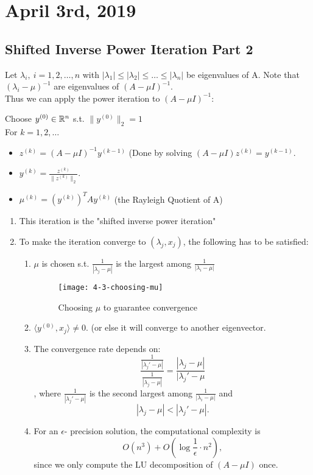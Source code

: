 \documentclass[../main/main.tex]{subfiles}
\begin{document}
\section{April  3rd, 2019}
\subsection{Shifted Inverse Power Iteration Part 2}
Let $\lambda_i,\ i=1,2,\ldots,n$ with $|\lambda_1|\le |\lambda_2|\le \ldots\le |\lambda_n|$ be eigenvalues of A. Note that $(\lambda_i-\mu)^{-1}$ are eigenvalues of $(A-\mu I)^{-1}$.\\

Thus we can apply the power iteration to $(A-\mu I)^{-1}$:
\begin{algo}
	Choose $y^{(0)}\in \mathbb{R}^{n}$ s.t. $\|y^{(0)}\|_2=1$\\ 
	For $k=1,2,\ldots$
	\begin{itemize}
		\item $z^{(k)}=(A-\mu I)^{-1} y^{(k-1)}$ (Done by solving $(A-\mu I)z^{(k)}=y^{(k-1)}$.
		\item $y^{(k)}=\frac{z^{(k)}}{\|z^{(k)}\|_2}$.
		\item $\mu^{(k)}=(y^{(k)})^{T}Ay^{(k)}$ (the Rayleigh Quotient of A)
	\end{itemize}
\end{algo}
\begin{enumerate}
	\item This iteration is the "shifted inverse power iteration"
	\item To make the iteration converge to $(\lambda_j,x_j)$, the following has to be satisfied:
	\begin{enumerate}
		\item $\mu$ is chosen s.t. $\frac{1}{|\lambda_j-\mu|}$ is the largest among $\frac{1}{|\lambda_i-\mu|}$
			\begin{figure}[h!]
				\centering
				\texttt{[image: 4-3-choosing-mu]}
				\caption{Choosing  $\mu$ to guarantee convergence}
			\end{figure}
		\item $\langle y^{(0)},x_j\rangle \neq 0$. (or else it will converge to another eigenvector.
		\item The convergence rate depends on: \[
				\frac{\frac{1}{|\lambda_j'-\mu|}}{\frac{1}{|\lambda_j-\mu|}}=\frac{|\lambda_j-\mu|}{|\lambda_j'-\mu}
		\],  where $\frac{1}{|\lambda_j'-\mu|}$ is the second largest among $\frac{1}{|\lambda_i-\mu|}$ and \[
		|\lambda_j-\mu|<|\lambda_j'-\mu|
		.\] 
	\item For an $\epsilon$- precision solution, the computational complexity is \[
	O(n^3)+O\left(\log \frac{1}{\epsilon}\cdot n^2\right)
,\] since we only compute the LU decomposition of  $\left( A-\mu I \right) $ once. 
\end{enumerate}
\end{enumerate}
\end{document}
